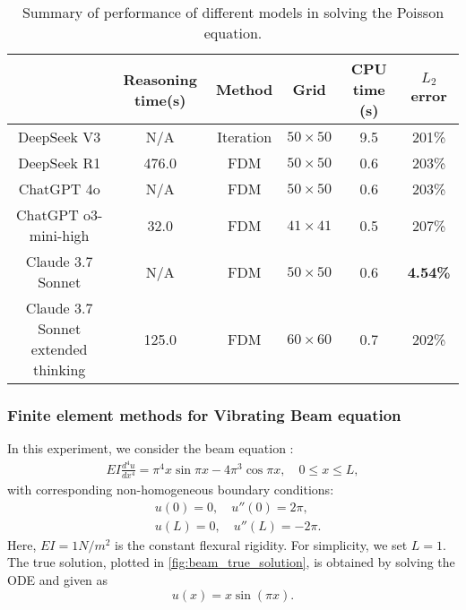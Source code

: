 \documentclass{article}
\begin{document}
\begin{table}[h!]
    \centering
    \renewcommand{\arraystretch}{1.5}
    \caption{Summary of performance of different models in solving the Poisson equation.}
    \vspace{2mm}
    \begin{tabular}{c|c|c|c|c|c}
    \toprule 
         &Reasoning time(s)& Method & Grid & CPU time (s) & 
         $L_{2}$ error \\
         \hline
        DeepSeek V3 & N/A& Iteration & $50\times 50$ & 9.5 & 201\%\\ 
        \hline
        DeepSeek R1 &476.0 &FDM& $50\times 50$ & 0.6& 203\%\\ 
        \hline
        ChatGPT 4o &N/A&FDM& $50\times 50$ & 0.6 & 203\%\\
        \hline
        ChatGPT o3-mini-high &32.0&FDM& $41\times 41$ & 0.5 & 207\%\\ 
        \hline
        Claude 3.7 Sonnet&N/A& FDM&$50\times 50$ & 0.6& \textbf{4.54\%}\\
        \hline
        Claude 3.7 Sonnet extended thinking&125.0& FDM&$60\times 60$ & 0.7&202\% \\ 
        \bottomrule
    \end{tabular}
    \label{tab:possion}
\end{table}
  


\subsubsection{Finite element methods for Vibrating Beam equation}
In this experiment, we consider the beam equation \cite{eliasson2016kam}:
\begin{align*}
EI \frac{d^4 u}{dx^4} = \pi^4 x \sin \pi x - 4\pi^3 \cos \pi x, \quad 0 \leq x \leq L,
\end{align*}
with corresponding non-homogeneous boundary conditions:
\begin{align*}
&u(0) = 0, \quad u''(0) = 2\pi,\\
&u(L) = 0, \quad u''(L) = -2\pi. 
\end{align*}
Here, $EI = 1N/m^{2}$ is the constant flexural rigidity. For simplicity, we set $L = 1$. The true solution, plotted in \autoref{fig:beam_true_solution}, is obtained by solving the ODE and given as 
\begin{equation*}
    u(x) = x\sin(\pi x).
\end{equation*}
\end{document}
